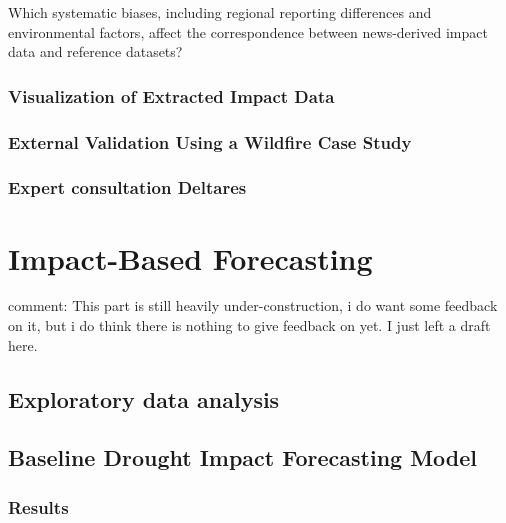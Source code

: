 \documentclass[11pt, a4paper, oneside]{book}
\begin{document}
Which systematic biases, including regional reporting differences and environmental factors, affect the correspondence between news-derived impact data and reference datasets?

\section{Visualization of Extracted Impact Data}




\newpage
\section{External Validation Using a Wildfire Case Study}

\section{Expert consultation Deltares}



\part{Impact-Based Forecasting }
\label{part b}
comment: This part is still heavily under-construction, i do want some feedback on it,  but i do think there is nothing to give feedback on yet. I just left a draft here.


\chapter{Exploratory data analysis}












\chapter{Baseline Drought Impact Forecasting Model}





\section{Results}
\end{document}
